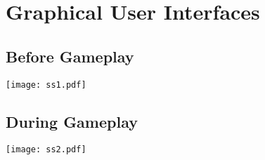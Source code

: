 \section{Graphical User Interfaces}
\subsection{Before Gameplay}
\begin{center}
\texttt{[image: ss1.pdf]}
\end{center}
\subsection{During Gameplay}
\begin{center}
\texttt{[image: ss2.pdf]}
\end{center}

